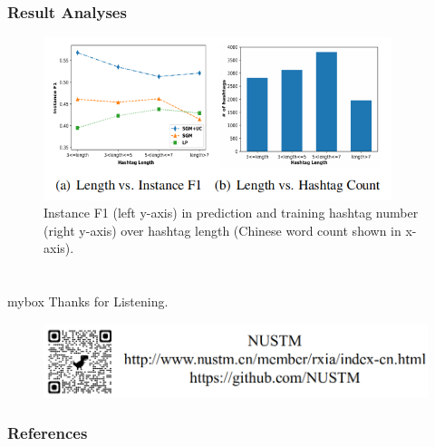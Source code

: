 \documentclass[10pt,aspectratio=43]{beamer}
\begin{document}
    \begin{frame}
        \frametitle{\textbf{Result Analyses}}
        \begin{figure}
            \centering
            \includegraphics[width=4in]{figures/results.png}
            \caption{Instance F1 (left y-axis) in prediction and training hashtag number (right y-axis) over hashtag length (Chinese word count shown in x-axis).}
            \label{fig:results}
        \end{figure}
    \end{frame}
    
\section*{}
    \begin{frame}
        \begin{center}
            \begin{minipage}{1\textwidth}
                \begin{beamercolorbox}[wd=0.70\textwidth, rounded=true, shadow=true]{mybox}
                    \LARGE \centering Thanks for Listening.
                \end{beamercolorbox}
            \end{minipage}
        \end{center}
        
        \begin{figure}[!t]
            \centering
            \includegraphics[width=.8\textwidth]{source/nustm_contact.png}
            \label{figure4_ad}
        \end{figure}
    \end{frame}
            
\begin{frame}[allowframebreaks]
    \frametitle{\textbf{References}}
    
    
\end{frame}
\end{document}
